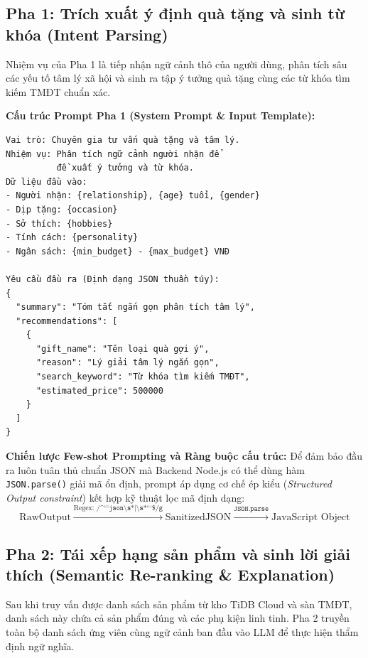 \subsection{Pha 1: Trích xuất ý định quà tặng và sinh từ khóa (Intent Parsing)}
Nhiệm vụ của Pha 1 là tiếp nhận ngữ cảnh thô của người dùng, phân tích sâu các yếu tố tâm lý xã hội và sinh ra tập ý tưởng quà tặng cùng các từ khóa tìm kiếm TMĐT chuẩn xác.

\begin{infobox}
\textbf{Cấu trúc Prompt Pha 1 (System Prompt \& Input Template):}
\footnotesize
\begin{verbatim}
Vai trò: Chuyên gia tư vấn quà tặng và tâm lý.
Nhiệm vụ: Phân tích ngữ cảnh người nhận để
          đề xuất ý tưởng và từ khóa.
Dữ liệu đầu vào:
- Người nhận: {relationship}, {age} tuổi, {gender}
- Dịp tặng: {occasion}
- Sở thích: {hobbies}
- Tính cách: {personality}
- Ngân sách: {min_budget} - {max_budget} VNĐ

Yêu cầu đầu ra (Định dạng JSON thuần túy):
{
  "summary": "Tóm tắt ngắn gọn phân tích tâm lý",
  "recommendations": [
    {
      "gift_name": "Tên loại quà gợi ý",
      "reason": "Lý giải tâm lý ngắn gọn",
      "search_keyword": "Từ khóa tìm kiếm TMĐT",
      "estimated_price": 500000
    }
  ]
}
\end{verbatim}
\end{infobox}

\textbf{Chiến lược Few-shot Prompting và Ràng buộc cấu trúc:}
Để đảm bảo đầu ra luôn tuân thủ chuẩn JSON mà Backend Node.js có thể dùng hàm \texttt{JSON.parse()} giải mã ổn định, prompt áp dụng cơ chế ép kiểu (\textit{Structured Output constraint}) kết hợp kỹ thuật lọc mã định dạng:
\begin{equation}
    \text{RawOutput} \xrightarrow{\text{Regex: } \texttt{/\textasciicircum```json\textbackslash s*|\textbackslash s*```\$/g}} \text{SanitizedJSON} \xrightarrow{\texttt{JSON.parse}} \text{JavaScript Object}
\end{equation}

\subsection{Pha 2: Tái xếp hạng sản phẩm và sinh lời giải thích (Semantic Re-ranking \& Explanation)}
Sau khi truy vấn được danh sách sản phẩm từ kho TiDB Cloud và sàn TMĐT, danh sách này chứa cả sản phẩm đúng và các phụ kiện linh tinh. Pha 2 truyền toàn bộ danh sách ứng viên cùng ngữ cảnh ban đầu vào LLM để thực hiện thẩm định ngữ nghĩa.

